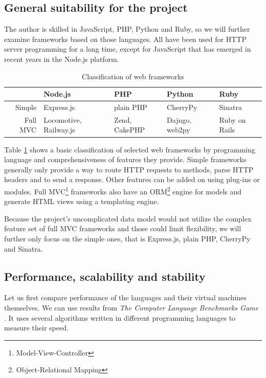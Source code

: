 \documentclass[12pt,oneside]{fithesis}
\begin{document}
	\subsection{General suitability for the project}
		The author is skilled in JavaScript, PHP, Python and Ruby, so we will further examine frameworks based on those languages. All have been used for HTTP server programming for a long time, except for JavaScript that has emerged in recent years in the Node.js platform.\\
		\begin{table}[htb]
		\begin{tabular}{|r||p{2.2cm}|p{2.2cm}|p{2.1cm}|p{2.2cm}|}
			\hline 
			\rule[-1ex]{0pt}{2.5ex} & Node.js & PHP & Python & Ruby \\ 
			\hline\hline
			\rule[-1ex]{0pt}{2.5ex} Simple & Express.js & plain PHP & CherryPy & Sinatra \\ 
			\hline 
			\rule[-1ex]{0pt}{2.5ex} Full MVC & Locomotive, Railway.js & Zend, CakePHP & Dajngo, web2py & Ruby on Rails \\ 
			\hline 
		\end{tabular}
		\caption{Classification of web frameworks}
		\label{table:wf}
		\end{table}
	
		Table \ref{table:wf} shows a basic classification of selected web frameworks by programming language and comprehensiveness of features they provide. Simple frameworks generally only provide a way to route HTTP requests to methods, parse HTTP headers and to send a response. Other features can be added on using plug-ins or modules. Full MVC\footnote{Model-View-Controller} frameworks also have an ORM\footnote{Object-Relational Mapping} engine for models and generate HTML views using a templating engine.
		
		Because the project's uncomplicated data model would not utilize the complex feature set of full MVC frameworks and those could limit flexibility, we will further only focus on the simple ones, that is Express.js, plain PHP, CherryPy and Sinatra.
		
	\subsection{Performance, scalability and stability}
		Let us first compare performance of the languages and their virtual machines themselves. We can use results from \emph{The Computer Language Benchmarks Game} \cite{website:bench}. It uses several algorithms written in different programming languages to measure their speed.
		
\end{document}
